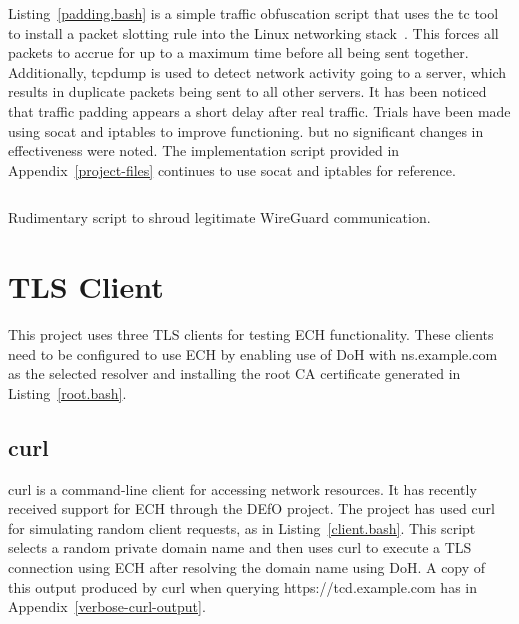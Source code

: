 Listing~\ref{padding.bash} is a simple traffic obfuscation script that uses the tc tool to install a packet slotting rule into the Linux networking stack~\cite{almesberger1999linux, hemminger2005network}. This forces all packets to accrue for up to a maximum time before all being sent together. Additionally, tcpdump is used to detect network activity going to a server, which results in duplicate packets being sent to all other servers. It has been noticed that traffic padding appears a short delay after real traffic. Trials have been made using socat and iptables to improve functioning. but no significant changes in effectiveness were noted. The implementation script provided in Appendix~\ref{project-files} continues to use socat and iptables for reference.

\begin{listing}[ht]
\inputminted{bash}{snippets/padding.bash}
\caption[Rudimentary script to shroud legitimate WireGuard communication]{Rudimentary script to shroud legitimate WireGuard communication.}
\label{padding.bash}
\end{listing}











\section{TLS Client}\label{tls-client}

This project uses three TLS clients for testing ECH functionality. These clients need to be configured to use ECH by enabling use of DoH with ns.example.com as the selected resolver and installing the root CA certificate generated in Listing~\ref{root.bash}.

\subsection{curl}

curl is a command-line client for accessing network resources. It has recently received support for ECH through the DEfO project. The project has used curl for simulating random client requests, as in Listing~\ref{client.bash}. This script selects a random private domain name and then uses curl to execute a TLS connection using ECH after resolving the domain name using DoH. A copy of this output produced by curl when querying https://tcd.example.com has in Appendix~\ref{verbose-curl-output}.

